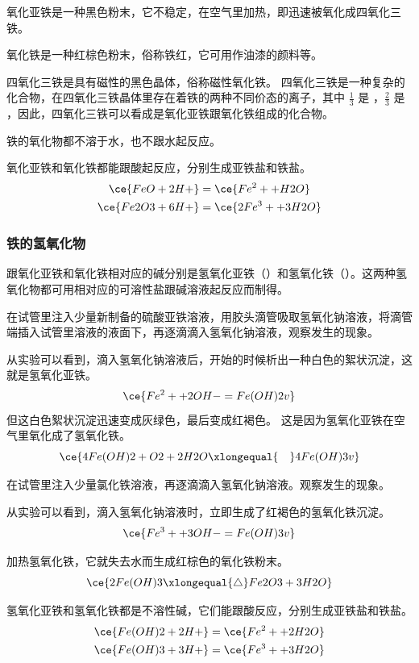 氧化亚铁是一种黑色粉末，它不稳定，在空气里加热，即迅速被氧化成四氧化三铁。

氧化铁是一种红棕色粉末，俗称铁红，它可用作油漆的颜料等。

四氧化三铁是具有磁性的黑色晶体，俗称磁性氧化铁。
四氧化三铁是一种复杂的化合物，在四氧化三铁晶体里存在着铁的两种不同价态的离子，其中 $\frac13$ 是 ，$\frac23$ 是 ，因此，四氧化三铁可以看成是氧化亚铁跟氧化铁组成的化合物。

铁的氧化物都不溶于水，也不跟水起反应。

氧化亚铁和氧化铁都能跟酸起反应，分别生成亚铁盐和铁盐。
\begin{align*}
  \ce{ FeO + 2H+ } & = \ce{  Fe^2+ + H2O }\\ 
  \ce{ Fe2O3 + 6H+ } & = \ce{ 2Fe^3+ + 3H2O }
\end{align*}

\subsubsection{铁的氢氧化物}
跟氧化亚铁和氧化铁相对应的碱分别是氢氧化亚铁（）和氢氧化铁（）。这两种氢氧化物都可用相对应的可溶性盐跟碱溶液起反应而制得。
\begin{Experiment}
在试管里注入少量新制备的硫酸亚铁溶液，用胶头滴管吸取氢氧化钠溶液，将滴管端插入试管里溶液的液面下，再逐滴滴入氢氧化钠溶液，观察发生的现象。
\end{Experiment}
从实验可以看到，滴入氢氧化钠溶液后，开始的时候析出一种白色的絮状沉淀，这就是氢氧化亚铁。
\[ \ce{ Fe^2+ + 2OH- = Fe(OH)2 v }\]
但这白色絮状沉淀迅速变成灰绿色，最后变成红褐色。
这是因为氢氧化亚铁在空气里氧化成了氢氧化铁。
\[ \ce{ 4Fe(OH)2 + O2 + 2H2O \xlongequal{\quad} 4Fe(OH)3 v}\]
\begin{Experiment}
  在试管里注入少量氯化铁溶液，再逐滴滴入氢氧化钠溶液。观察发生的现象。
\end{Experiment}
从实验可以看到，滴入氢氧化钠溶液时，立即生成了红褐色的氢氧化铁沉淀。
\[ \ce{ Fe^3+ + 3OH- = Fe(OH)3 v}\]

加热氢氧化铁，它就失去水而生成红棕色的氧化铁粉末。
\[ \ce{ 2Fe(OH)3 \xlongequal{\triangle} Fe2O3 + 3H2O }\]

氢氧化亚铁和氢氧化铁都是不溶性碱，它们能跟酸反应，分别生成亚铁盐和铁盐。
\begin{align*}
  \ce{Fe(OH)2 + 2H+}  &= \ce{Fe^2+ + 2H2O}\\
  \ce{Fe(OH)3 + 3H+}  &= \ce{Fe^3+ + 3H2O}
\end{align*}

